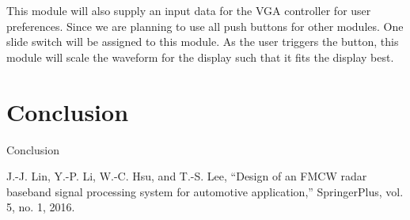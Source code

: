 \documentclass[paper]{IEEEtran}
\begin{document}
	This module will also supply an input data for the VGA controller for user preferences. Since we are planning to use all push buttons for other modules. One slide switch will be assigned to this module. As the user triggers the button, this module will scale the waveform for the display such that it fits the display best.

	
	
\section{Conclusion}
\- \indent
	Conclusion
	
	

\begin{thebibliography}{00}
 J.-J. Lin, Y.-P. Li, W.-C. Hsu, and T.-S. Lee, “Design of an FMCW radar baseband signal processing system for automotive application,” SpringerPlus, vol. 5, no. 1, 2016.	

\end{thebibliography}
\end{document}

